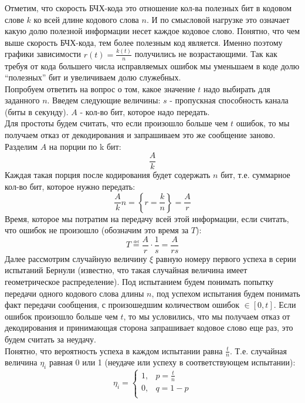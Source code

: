 \documentclass[12pt]{article}
\newcommand{\defeq}{\overset{\underset{\mathrm{def}}{}}{=}}
\begin{document}
            Отметим, что скорость БЧХ-кода это отношение кол-ва полезных бит в кодовом слове $k$ ко всей длине кодового слова $n$. И по смысловой нагрузке это означает какую долю полезной информации несет каждое кодовое слово. Понятно, что чем выше скорость БЧХ-кода, тем более полезным код является. Именно поэтому графики зависимости $r(t)=\frac{k(t)}{n}$ получились не возрастающими. Так как требуя от кода большего числа исправляемых ошибок мы уменьшаем в коде долю ``полезных'' бит и увеличиваем долю служебных. \\

            Попробуем ответить на вопрос о том, какое значение $t$ надо выбирать для заданного $n$. Введем следующие величины: $s$ - пропускная способность канала (биты в секунду). $A$ - кол-во бит, которое надо передать. \\

            Для простоты будем считать, что если произошло больше чем $t$ ошибок, то мы получаем отказ от декодирования и запрашиваем это же сообщение заново. \\

            Разделим $A$ на порции по k бит:
            $$
                \frac{A}{k}
            $$
            Каждая такая порция после кодирования будет содержать $n$ бит, т.е. суммарное кол-во бит, которое нужно передать:
            $$
                \frac{A}{k}n = \left\{r=\frac{k}{n}\right\} =  \frac{A}{r}
            $$
            Время, которое мы потратим на передачу всей этой информации, если считать, что ошибок не произошло (обозначим это время за $T$):
            $$
                T \defeq \frac{A}{r}\cdot\frac{1}{s} = \frac{A}{rs}
            $$
            Далее рассмотрим случайную величину $\xi$ равную номеру первого успеха в серии испытаний Бернули (известно, что такая случайная величина имеет геометрическое распределение). Под испытанием будем понимать попытку передачи одного кодового слова длины $n$, под успехом испытания будем понимать факт передачи сообщения, с произошедшим количеством ошибок $\in [0, t]$. Если ошибок произошло больше чем $t$, то мы условились, что мы получаем отказ от декодирования и принимающая сторона запрашивает кодовое слово еще раз, это будем считать за неудачу. \\

            Понятно, что вероятность успеха в каждом испытании равна $\frac{t}{n}$. Т.е. случайная величина $\eta_i$ равная 0 или 1 (неудаче или успеху в соответствующем испытании):
            $$
                \eta_i = \left\{\begin{array}{ll}
                    1, & p = \frac{t}{n} \\
                    0, & q = 1 - p \\
                \end{array}\right.
            $$
\end{document}
